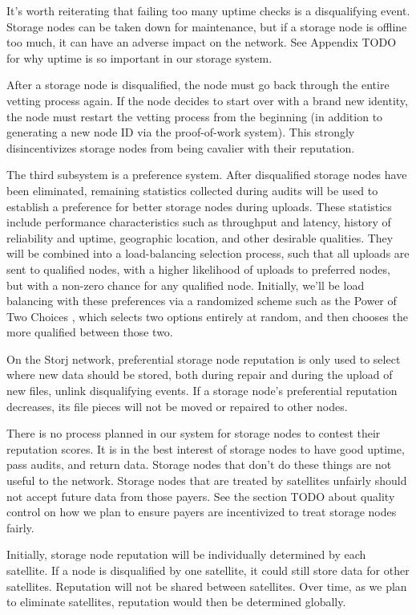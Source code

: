 \documentclass[a4paper,10pt]{article} \usepackage[utf8]{inputenc}
\newcommand{\todo}[1]{{\color{red} TODO #1 }}
\begin{document}
It's worth reiterating that failing too many uptime checks is a disqualifying
event. Storage nodes can be taken down for maintenance, but if a storage node
is offline too much, it can have an adverse impact on the network. See Appendix
\todo{} for why uptime is so important in our storage system.

After a storage node is disqualified, the node must go back through the entire
vetting process again. If the node decides to start over with a brand new
identity, the node must restart the vetting process from the beginning (in
addition to generating a new node ID via the proof-of-work system). This
strongly disincentivizes storage nodes from being cavalier with their
reputation.

The third subsystem is a preference system. After disqualified storage nodes
have been eliminated, remaining statistics collected during audits
will be used to establish a preference for better storage nodes during uploads.
These statistics include performance characteristics such as throughput and
latency, history of reliability and uptime, geographic location, and other
desirable qualities.
They will be combined into a load-balancing selection process, such
that all uploads are sent to qualified nodes, with a higher likelihood of
uploads to preferred nodes, but with a non-zero chance for any qualified node.
Initially, we'll be load balancing with these preferences via a randomized
scheme such as the Power of Two Choices \cite{power-of-two-choices}, which
selects two options entirely at random, and then chooses the more qualified
between those two.

On the Storj network, preferential storage node reputation is only used to
select where new data should be stored, both during repair and during the
upload of new files, unlink disqualifying events.
If a storage node's preferential reputation decreases, its file pieces will not
be moved or repaired to other nodes.

There is no process planned in our system for storage nodes to contest their
reputation scores. It is in the best interest of storage nodes to have good
uptime, pass audits, and return data. Storage nodes that don't do these things
are not useful to the network. Storage nodes that are treated by satellites
unfairly should not accept future data from those payers. See the section
\todo{} about quality control on how we plan to ensure payers are incentivized
to treat storage nodes fairly.

Initially, storage node reputation will be individually determined by each
satellite. If a node is disqualified by one satellite, it could still
store data for other satellites. Reputation will not be shared between
satellites. Over time, as we plan to eliminate satellites,
reputation would then be determined globally.
\end{document}
